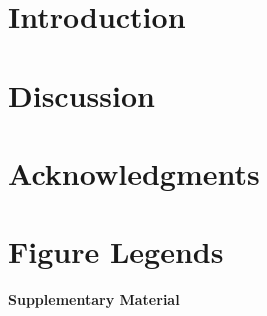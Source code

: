 \section{Introduction}






\section{Discussion}


%

\section{Acknowledgments}




\pagebreak
\section{Figure Legends}


\FloatBarrier

%
%
%
%


\pagebreak
\beginsupplement
\setcounter{secnumdepth}{4}
{\noindent\Large\bfseries Supplementary Material}

%
%

\FloatBarrier
\pagebreak

\pagebreak

\pagebreak

%
\pagebreak


\FloatBarrier
\pagebreak

% 


